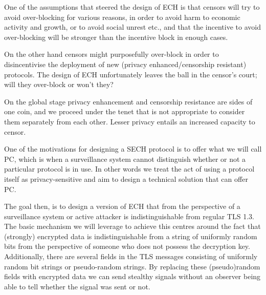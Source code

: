 One of the assumptions that steered the design of \ac{ECH} is that
censors will try to avoid over-blocking for various reasons,
in order to avoid harm to economic activity and growth,
or to avoid social unrest etc., and that the incentive
to avoid over-blocking will be stronger than the incentive block in enough cases.

On the other hand censors might purposefully over-block in order to disincentivise the deployment of new (privacy enhanced/censorship resistant) protocols.
The design of \ac{ECH} unfortunately leaves the ball in the censor's court;
will they over-block or won't they?

On the global stage privacy enhancement and censorship resistance are sides of one coin,
and we proceed under the tenet that is not appropriate to consider them separately from each other.
Lesser privacy entails an increased capacity to censor.


One of the motivations for designing a \ac{SECH} protocol is to
offer what we will call \ac{PC},
which is when a surveillance system cannot distinguish whether or not
a particular protocol is in use.
In other words we treat the act of using a protocol itself as privacy-sensitive
and aim to design a technical solution that can offer \ac{PC}.

The goal then, is to design a version of \ac{ECH} that from
the perspective of a surveillance system or active attacker is indistinguishable
from regular \ac{TLS} 1.3.
The basic mechanism we will leverage to achieve this centres around
the fact that (strongly) encrypted data is indistinguishable from
a string of uniformly random bits from the perspective of someone
who does not possess the decryption key.
Additionally, there are several fields in the \ac{TLS}
messages consisting of uniformly random bit strings or pseudo-random strings.
By replacing these (pseudo)random fields with encrypted data we can send
stealthy signals without an observer being able to tell whether the signal was sent or not.




